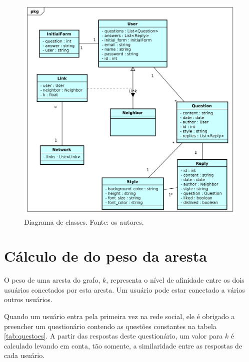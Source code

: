 \begin{figure}[!htb]
\centering
\includegraphics[width=16cm]{DiagramaClasse.png}
\caption{Diagrama de classes. Fonte: os autores.}
\label{fig:diagramaClasse}
\end{figure}
\FloatBarrier




\section{Cálculo de do peso da aresta}
O peso de uma aresta do grafo, $k$, representa o nível de afinidade entre os dois usuários conectados por esta aresta. Um usuário pode estar conectado a vários outros usuários.

Quando um usuário entra pela primeira vez na rede social, ele é obrigado a preencher um questionário contendo as questões constantes na tabela \ref{tab:questoes}. A partir das respostas deste questionário, um valor para $k$ é calculado levando em conta, tão somente, a similaridade entre as respostas de cada usuário.

